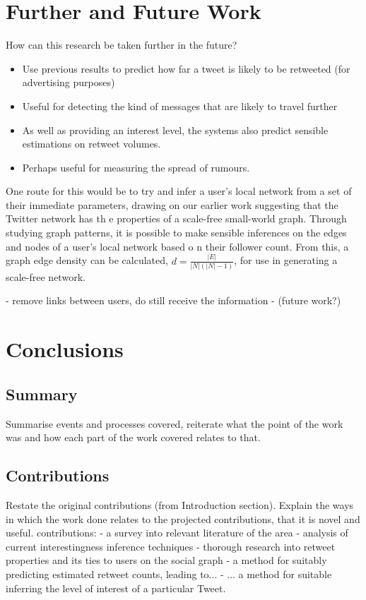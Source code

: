\section{Further and Future Work}
How can this research be taken further in the future?

\begin{itemize}
\item Use previous results to predict how far a tweet is likely to be retweeted (for advertising purposes)
\item Useful for detecting the kind of messages that are likely to travel further
\item As well as providing an interest level, the systems also predict sensible estimations on retweet volumes.
\item Perhaps useful for measuring the spread of rumours.
\end{itemize}

One route for this would be to try and infer a user's local network from a set of their immediate parameters, drawing on our earlier work suggesting that the Twitter network has th    e properties of a scale-free small-world graph. Through studying graph patterns, it is possible to make sensible inferences on the edges and nodes of a user's local network based o    n their follower count. From this, a graph edge density can be calculated, $ d = \frac{|E|}{|N|(|N|-1)} $, for use in generating a scale-free network.

- remove links between users, do still receive the information - (future work?)


\section{Conclusions}
\subsection{Summary}
Summarise events and processes covered, reiterate what the point of the work was and how each part of the work covered relates to that.

\subsection{Contributions}
Restate the original contributions (from Introduction section). Explain the ways in which the work done relates to the projected contributions, that it is novel and useful.
contributions:
- a survey into relevant literature of the area
- analysis of current interestingness inference techniques
- thorough research into retweet properties and its ties to users on the social graph
- a method for suitably predicting estimated retweet counts, leading to...
- ... a method for suitable inferring the level of interest of a particular Tweet.
